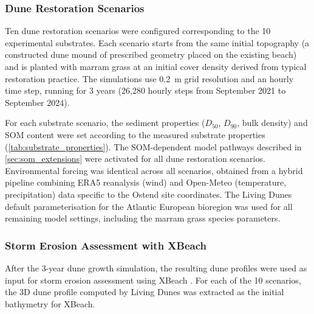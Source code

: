 \documentclass[authoryear,preprint,review,12pt]{elsarticle}
\begin{document}
\subsubsection{Dune Restoration Scenarios}

Ten dune restoration scenarios were configured corresponding to the 10 experimental substrates. Each scenario starts from the same initial topography (a constructed dune mound of prescribed geometry placed on the existing beach) and is planted with marram grass at an initial cover density derived from typical restoration practice. The simulations use \SI{0.2}{\metre} grid resolution and an hourly time step, running for 3 years (26,280 hourly steps from September 2021 to September 2024).

For each substrate scenario, the sediment properties ($D_{50}$, $D_{90}$, bulk density) and SOM content were set according to the measured substrate properties (\cref{tab:substrate_properties}). The SOM-dependent model pathways described in \cref{sec:som_extensions} were activated for all dune restoration scenarios. Environmental forcing was identical across all scenarios, obtained from a hybrid pipeline combining ERA5 reanalysis (wind) and Open-Meteo (temperature, precipitation) data specific to the Ostend site coordinates. The Living Dunes default parameterisation for the Atlantic European bioregion was used for all remaining model settings, including the marram grass species parameters.

\subsubsection{Storm Erosion Assessment with XBeach}

After the 3-year dune growth simulation, the resulting dune profiles were used as input for storm erosion assessment using XBeach \citep{roelvink2009modelling}. For each of the 10 scenarios, the 3D dune profile computed by Living Dunes was extracted as the initial bathymetry for XBeach.
\end{document}
